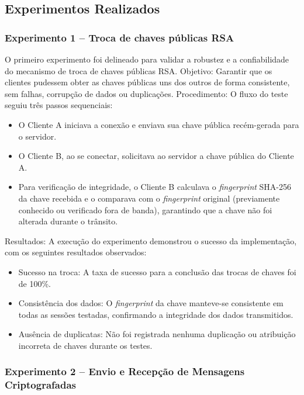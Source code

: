 \subsection{Experimentos Realizados}

\subsubsection{Experimento 1 – Troca de chaves públicas \acs{RSA}}

O primeiro experimento foi delineado para validar a robustez e a
confiabilidade do mecanismo de troca de chaves públicas \acs{RSA}.
Objetivo: Garantir que os clientes pudessem obter as chaves públicas
uns dos outros de forma consistente, sem falhas, corrupção de dados
ou duplicações. Procedimento: O fluxo do teste seguiu três passos sequenciais:

\begin{itemize}
  \item O Cliente A iniciava a conexão e enviava sua chave pública
    recém-gerada para o servidor.
  \item O Cliente B, ao se conectar, solicitava ao servidor a chave
    pública do Cliente A.
  \item Para verificação de integridade, o Cliente B calculava o
    \textit{fingerprint} SHA-256 da chave recebida e o comparava com o
    \textit{fingerprint} original (previamente conhecido ou verificado fora de
    banda), garantindo que a chave não foi alterada durante o trânsito.
\end{itemize}

Resultados: A execução do experimento demonstrou o sucesso da
implementação, com os seguintes resultados observados:

\begin{itemize}
  \item Sucesso na troca: A taxa de sucesso para a conclusão das
    trocas de chaves foi de 100\%.
  \item Consistência dos dados: O \textit{fingerprint} da chave manteve-se
    consistente em todas as sessões testadas, confirmando a
    integridade dos dados transmitidos.
  \item Ausência de duplicatas: Não foi registrada nenhuma duplicação
    ou atribuição incorreta de chaves durante os testes.
\end{itemize}

\subsubsection{Experimento 2 – Envio e Recepção de Mensagens Criptografadas}

